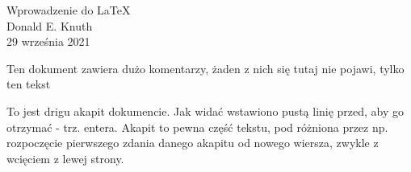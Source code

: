 \documentclass{article}
\author{Michał Hulii}
\date{\today}
\begin{document}
	\begin{center}
		Wprowadzenie do \LaTeX * \\
		Donald E. Knuth \\
		29 września 2021
	\end{center}

	Ten dokument zawiera dużo komentarzy, żaden z nich się tutaj nie pojawi, tylko ten tekst
	
	To jest drigu akapit dokumencie. Jak widać wstawiono pustą linię przed, aby go otrzymać - trz. entera. Akapit to pewna część tekstu, pod różniona przez np. rozpoczęcie pierwszego zdania danego akapitu od nowego wiersza, zwykle z wcięciem z lewej strony.
	
\end{document}
